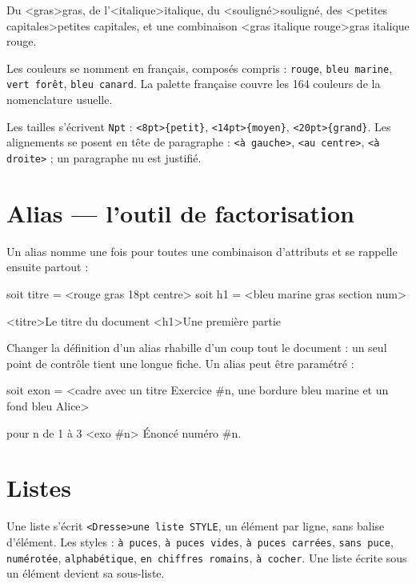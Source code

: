\documentclass[11pt,a4paper]{article}
\newcommand{\bal}[1]{\texttt{#1}}
\begin{document}
\begin{code}
Du <gras>{gras}, de l'<italique>{italique}, du <souligné>{souligné},
des <petites capitales>{petites capitales}, et une combinaison
<gras italique rouge>{gras italique rouge}.
\end{code}

Les couleurs se nomment en français, composés compris : \bal{rouge},
\bal{bleu marine}, \bal{vert forêt}, \bal{bleu canard}. La palette
française couvre les 164 couleurs de la nomenclature usuelle.

Les tailles s'écrivent \bal{Npt} : \bal{<8pt>\{petit\}},
\bal{<14pt>\{moyen\}}, \bal{<20pt>\{grand\}}. Les alignements se posent
en tête de paragraphe : \bal{<à gauche>}, \bal{<au centre>},
\bal{<à droite>} ; un paragraphe nu est justifié.

\section{Alias --- l'outil de factorisation}

Un alias nomme une fois pour toutes une combinaison d'attributs et se
rappelle ensuite partout :

\begin{code}
soit titre = <rouge gras 18pt centre>
soit h1 = <bleu marine gras section num>

<titre>Le titre du document
<h1>Une première partie
\end{code}

Changer la définition d'un alias rhabille d'un coup tout le document :
un seul point de contrôle tient une longue fiche. Un alias peut être
paramétré :

\begin{code}
soit exo{n} = <cadre avec un titre {Exercice #n}, une bordure bleu marine
    et un fond bleu Alice>

pour n de 1 à 3 {
    <exo #n>{ Énoncé numéro #n. }
}
\end{code}

\section{Listes}

Une liste s'écrit \bal{<Dresse>une liste STYLE}, un élément par ligne, sans
balise d'élément. Les styles : \bal{à puces}, \bal{à puces vides},
\bal{à puces carrées}, \bal{sans puce}, \bal{numérotée},
\bal{alphabétique}, \bal{en chiffres romains}, \bal{à cocher}. Une
liste écrite sous un élément devient sa sous-liste.
\end{document}
